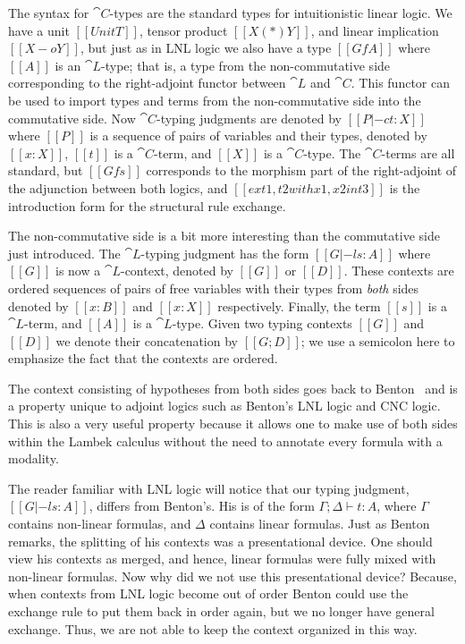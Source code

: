 The syntax for $\cat{C}$-types are the standard types for
intuitionistic linear logic.  We have a unit $[[UnitT]]$, tensor
product $[[X (*) Y]]$, and linear implication $[[X -o Y]]$, but just
as in LNL logic we also have a type $[[Gf A]]$ where $[[A]]$ is an
$\cat{L}$-type; that is, a type from the non-commutative side
corresponding to the right-adjoint functor between $\cat{L}$ and
$\cat{C}$. This functor can be used to import types and terms from the
non-commutative side into the commutative side.  Now $\cat{C}$-typing
judgments are denoted by $[[P |-c t : X]]$ where $[[P]]$ is a sequence
of pairs of variables and their types, denoted by $[[x : X]]$, $[[t]]$
is a $\cat{C}$-term, and $[[X]]$ is a $\cat{C}$-type.  The
$\cat{C}$-terms are all standard, but $[[Gf s]]$ corresponds to the
morphism part of the right-adjoint of the adjunction between both
logics, and $[[ex t1 , t2 with x1 , x2 in t3]]$ is the introduction
form for the structural rule exchange.

The non-commutative side is a bit more interesting than the
commutative side just introduced.  The $\cat{L}$-typing judgment has
the form $[[G |-l s : A]]$ where $[[G]]$ is now a $\cat{L}$-context,
denoted by $[[G]]$ or $[[D]]$. These contexts are ordered sequences of
pairs of free variables with their types from \emph{both} sides
denoted by $[[x : B]]$ and $[[x : X]]$ respectively. Finally, the term
$[[s]]$ is a $\cat{L}$-term, and $[[A]]$ is a $\cat{L}$-type.  Given
two typing contexts $[[G]]$ and $[[D]]$ we denote their concatenation
by $[[G;D]]$; we use a semicolon here to emphasize the fact that the
contexts are ordered.

The context consisting of hypotheses from both sides goes back to
Benton~\cite{Benton:1994} and is a property unique to adjoint logics
such as Benton's LNL logic and CNC logic.  This is also a very useful
property because it allows one to make use of both sides within the
Lambek calculus without the need to annotate every formula with a
modality.

The reader familiar with LNL logic will notice that our typing
judgment, $[[G |-l s : A]]$, differs from Benton's. His is of the form
$\Gamma;\Delta \vdash t : A$, where $\Gamma$ contains non-linear
formulas, and $\Delta$ contains linear formulas.  Just as Benton
remarks, the splitting of his contexts was a presentational device.
One should view his contexts as merged, and hence, linear formulas
were fully mixed with non-linear formulas.  Now why did we not use
this presentational device?  Because, when contexts from LNL logic
become out of order Benton could use the exchange rule to put them
back in order again, but we no longer have general exchange. Thus, we
are not able to keep the context organized in this way.

